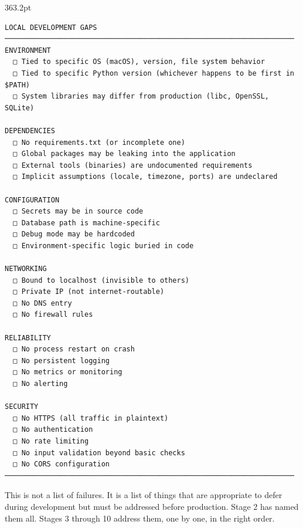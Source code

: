 \begin{diagrambox}[short]{363.2pt}
\begin{Verbatim}[fontsize=\fontsize{9.0}{8.55}\selectfont]
LOCAL DEVELOPMENT GAPS
─────────────────────────────────────────────────────────────────────
ENVIRONMENT
  □ Tied to specific OS (macOS), version, file system behavior
  □ Tied to specific Python version (whichever happens to be first in $PATH)
  □ System libraries may differ from production (libc, OpenSSL, SQLite)

DEPENDENCIES
  □ No requirements.txt (or incomplete one)
  □ Global packages may be leaking into the application
  □ External tools (binaries) are undocumented requirements
  □ Implicit assumptions (locale, timezone, ports) are undeclared

CONFIGURATION
  □ Secrets may be in source code
  □ Database path is machine-specific
  □ Debug mode may be hardcoded
  □ Environment-specific logic buried in code

NETWORKING
  □ Bound to localhost (invisible to others)
  □ Private IP (not internet-routable)
  □ No DNS entry
  □ No firewall rules

RELIABILITY
  □ No process restart on crash
  □ No persistent logging
  □ No metrics or monitoring
  □ No alerting

SECURITY
  □ No HTTPS (all traffic in plaintext)
  □ No authentication
  □ No rate limiting
  □ No input validation beyond basic checks
  □ No CORS configuration
─────────────────────────────────────────────────────────────────────
\end{Verbatim}
\end{diagrambox}

\noindent{}This is not a list of failures. It is a list of things that are appropriate to defer during development but must be addressed before production. Stage 2 has named them all. Stages 3 through 10 address them, one by one, in the right order.


